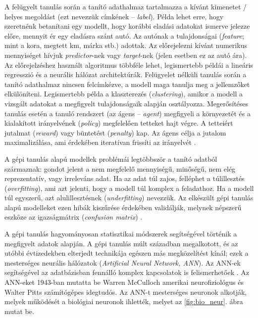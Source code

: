 \documentclass[12pt,a4paper]{article}
\begin{document}
A felügyelt tanulás során a tanító adathalmaz tartalmazza a kívánt kimenetet / helyes megoldást (ezt nevezzük címkének -- \textit{label}). Példa lehet erre, hogy szeretnénk betanítani egy modellt, hogy korábbi eladási adatokat ismerve jelezze előre, mennyit ér egy eladásra szánt autó. Az autónak a tulajdonságai (\textit{feature}; mint a kora, megtett km, márka stb.) adottak. Az előrejelezni kívánt numerikus mennyiséget hívjuk \textit{predictor}-nek vagy \textit{target}-nek (jelen esetben ez az autó ára). Az előrejelzéshez használt algoritmus többféle lehet, legismertebb példái a lineáris regresszió és a neurális hálózat architektúrák. Felügyelet nélküli tanulás során a tanító adathalmaz nincsen felcímkézve, a modell maga tanulja meg a jellemzőket elkülöníteni. Legismertebb példa a klaszterezés (\textit{clustering}), amikor a modell a vizsgált adatokat a megfigyelt tulajdonságaik alapján osztályozza. Megerősítéses tanulás esetén a tanuló rendszert (az ágens -- \textit{agent}) megfigyeli a környezetét és a kialakított irányelvének (\textit{policy}) megfelelően tetteket hajt végre. A tetteiért jutalmat (\textit{reward}) vagy büntetést (\textit{penalty}) kap. Az ágens célja a jutalom maximalizálása, ami érdekében iteratívan frissíti az irányelvét \cite{geron_hands-machine_2017}. 

A gépi tanulás alapú modellek problémái legtöbbször a tanító adatból származnak: gondot jelent a nem megfelelő mennyiségű, minőségű, nem elég reprezentatív, vagy irreleváns adat. Ha az adat túl zajos, felléphet a túlillesztés (\textit{overfitting}), ami azt jelenti, hogy a modell túl komplex a feladathoz. Ha a modell túl egyszerű, azt alulillesztésnek (\textit{underfitting}) nevezzük. Az elkészült gépi tanulás alapú modelleket ezen hibák kiszűrése érdekében validálják, melynek népszerű eszköze az igazságmátrix (\textit{confusion matrix}) \cite{geron_hands-machine_2017}.

A gépi tanulás hagyományosan statisztikai módszerek segítségével történik a megfigyelt adatok alapján. A gépi tanulás múlt században megalkotott, és az utóbbi évtizedekben elterjedt technikája egészen más megközelítést kínál; ezek a mesterséges neurális hálózatok (\textit{Artificial Neural Network, ANN}). Az ANN-ek segítségével az adatbázisban fennálló komplex kapcsolatok is felismerhetőek \cite{sharifani_machine_2023}. Az ANN-eket 1943-ban mutatta be Warren McCulloch amerikai neurofiziológus és Walter Pitts számítógépes idegtudós. Az ANN-t mesterséges neuronok alkotják, melyek működését a biológiai neuronok ihlették, melyet az \ref{fig:bio_neur}. ábra mutat be.
\end{document}
